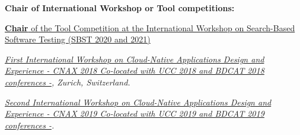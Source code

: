\documentclass[10pt]{article}
\begin{document}
\textbf{Chair of International Workshop or Tool competitions:}
\begin{innerlist}
\item \href{}
                   {\textbf{Chair} of the Tool Competition at the 
International Workshop on Search-Based Software Testing (SBST 2020 and 2021)} 
       \item \emph{\href{http://cnax.servicelaboratory.ch/}
                   {\textit{First International Workshop on Cloud-Native Applications Design and Experience - CNAX 2018
Co-located with UCC 2018 and BDCAT 2018 conferences -}}, Zurich, Switzerland.}

       \item \emph{\href{}
                   {\textit{Second International Workshop on Cloud-Native Applications Design and Experience - CNAX 2019
Co-located with UCC 2019 and BDCAT 2019 conferences -}}.}\\
\end{innerlist}
\end{document}
